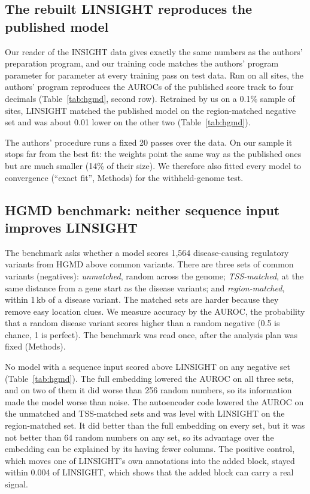 \documentclass[11pt]{article}
\begin{document}
\subsection*{The rebuilt LINSIGHT reproduces the published model}
Our reader of the INSIGHT data gives exactly the same numbers as the authors' preparation program,
and our training code matches the authors' program parameter for parameter at every training pass on
test data. Run on all sites, the
authors' program reproduces the AUROCs of the published score track to four decimals
(Table~\ref{tab:hgmd}, second row). Retrained by us on a 0.1\% sample of sites, LINSIGHT matched the published model on the
region-matched negative set and was about 0.01 lower on the other two (Table~\ref{tab:hgmd}).

The authors' procedure runs a fixed 20 passes over the data. On our sample it stops far from the best
fit: the weights point the same way as the published ones but are much smaller (14\% of their size).
We therefore also fitted every model to convergence (``exact fit'', Methods) for the withheld-genome
test.

\subsection*{HGMD benchmark: neither sequence input improves LINSIGHT}
The benchmark asks whether a model scores 1,564 disease-causing regulatory variants from HGMD above
common variants. There are three sets of common variants (negatives): \emph{unmatched}, random
across the genome; \emph{TSS-matched}, at the same distance from a gene start as the disease variants;
and \emph{region-matched}, within 1\,kb of a disease variant. The matched sets are harder because they
remove easy location clues. We measure accuracy by the AUROC, the probability that a random disease
variant scores higher than a random negative (0.5 is chance, 1 is perfect). The benchmark was read once,
after the analysis plan was fixed (Methods).

No model with a sequence input scored above LINSIGHT on any negative set (Table~\ref{tab:hgmd}). The full embedding lowered the AUROC on all three sets, and on two of them it
did worse than 256 random numbers, so its information made the model worse than noise. The
autoencoder code lowered the AUROC on the unmatched and TSS-matched sets and was level with LINSIGHT on
the region-matched set. It did better than the full embedding on every set, but it was not better than
64 random numbers on any set, so its advantage over the embedding can be explained by its having fewer
columns. The positive control, which moves one of LINSIGHT's own annotations into the added
block, stayed within 0.004 of LINSIGHT, which shows that the added block can carry a real signal.
\end{document}
